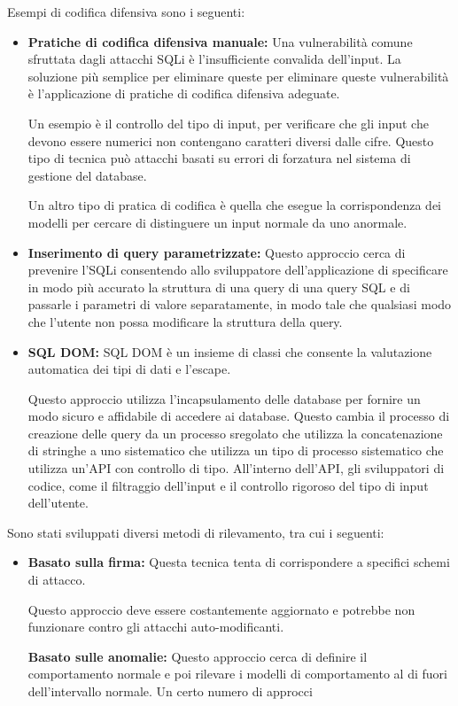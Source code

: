 \singlespacing

Esempi di codifica difensiva sono i seguenti:

\begin{itemize}
    \item \textbf{Pratiche di codifica difensiva manuale:} Una vulnerabilità comune sfruttata dagli attacchi SQLi è l'insufficiente convalida dell'input. La soluzione più semplice per eliminare queste per eliminare queste vulnerabilità è l'applicazione di pratiche di codifica difensiva adeguate. 
    
    Un esempio è il controllo del tipo di input, per verificare che gli input che devono essere numerici non contengano caratteri diversi dalle cifre. Questo tipo di tecnica può attacchi basati su errori di forzatura nel sistema di gestione del database.
    
    \singlespacing
    
    Un altro tipo di pratica di codifica è quella che esegue la corrispondenza dei modelli per cercare di distinguere un input normale da uno anormale.
    
    \item \textbf{Inserimento di query parametrizzate:} Questo approccio cerca di prevenire l'SQLi consentendo allo sviluppatore dell'applicazione di specificare in modo più accurato la struttura di una query di una query SQL e di passarle i parametri di valore separatamente, in modo tale che qualsiasi modo che l'utente non possa modificare la struttura della query.
    
    \item \textbf{SQL DOM:} SQL DOM è un insieme di classi che consente la valutazione automatica dei tipi di dati e l'escape.
    
    Questo approccio utilizza l'incapsulamento delle database per fornire un modo sicuro e affidabile di accedere ai database. Questo cambia il processo di creazione delle query da un processo sregolato che utilizza la concatenazione di stringhe a uno sistematico che utilizza un tipo di processo sistematico che utilizza un'API con controllo di tipo. All'interno dell'API, gli sviluppatori di codice, come il filtraggio dell'input e il controllo rigoroso del tipo di input dell'utente.
\end{itemize}
Sono stati sviluppati diversi metodi di rilevamento, tra cui i seguenti:
\begin{itemize}
    \item \textbf{Basato sulla firma:} Questa tecnica tenta di corrispondere a specifici schemi di attacco.
    
    Questo approccio deve essere costantemente aggiornato e potrebbe non funzionare contro gli attacchi auto-modificanti.
    
    \textbf{Basato sulle anomalie:} Questo approccio cerca di definire il comportamento normale e poi rilevare i modelli di comportamento al di fuori dell'intervallo normale. Un certo numero di approcci
\end{itemize}
